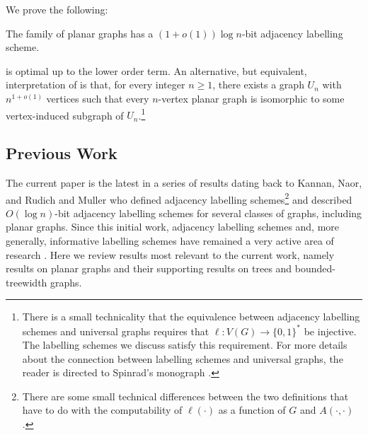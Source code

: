\documentclass[kpfonts]{patmorin}
\let\ge\geqslant
\begin{document}
We prove the following:
\begin{thm}
  The family of planar graphs has a $(1+o(1))\log n$-bit adjacency labelling scheme.
\end{thm}


 is optimal up to the lower order term.  An alternative, but equivalent, interpretation of  is that, for every integer $n\ge 1$, there exists a graph $U_n$ with $n^{1+o(1)}$  vertices such that every $n$-vertex planar graph is isomorphic to some vertex-induced subgraph of $U_n$.\footnote{There is a small technicality that the equivalence between adjacency labelling schemes and universal graphs requires that $\ell:V(G)\to\{0,1\}^*$ be injective.  The labelling schemes we discuss satisfy this requirement.  For more details about the connection between labelling schemes and universal graphs, the reader is directed to Spinrad's monograph \cite[Section~2.1]{spinrad:efficient}.} 

\subsection{Previous Work}

The current paper is the latest in a series of results dating back to Kannan, Naor, and Rudich \cite{kannan.naor.ea:implicit0,kannan.naor.ea:implicit} and Muller \cite{muller:local} who defined adjacency labelling schemes\footnote{There are some small technical differences between the two definitions that have to do with the computability of $\ell(\cdot)$ as a function of $G$ and
$A(\cdot,\cdot)$.} and described $O(\log n)$-bit adjacency labelling schemes for several classes of graphs, including planar graphs.  Since this initial work, adjacency labelling schemes and, more generally, informative labelling schemes have remained a very active area of research \cite{adjiashvili.rotbart:labeling,alstrup.kaplan.ea:adjacency,abrahamsen.alstrup.ea:near-optimal,alstrup.dahlgaard.ea:sublinear,alstrup.gortz.ea:distance,alstrup.gavoille.ea:simpler,alstrup.rauhe:improved}. Here we review results most relevant to the current work, namely results on planar graphs and their supporting results on trees and bounded-treewidth graphs.
\end{document}
